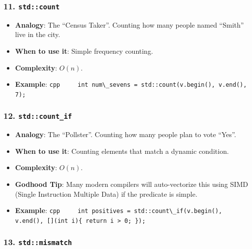 \hypertarget{stdcount}{%
\subsubsection{\texorpdfstring{11.
\texttt{std::count}}{11. std::count}}\label{stdcount}}

\begin{itemize}
\tightlist
\item
  \textbf{Analogy}: The ``Census Taker''. Counting how many people named
  ``Smith'' live in the city.
\item
  \textbf{When to use it}: Simple frequency counting.
\item
  \textbf{Complexity}: \(O(n)\).
\item
  \textbf{Example}:
  \passthrough{\lstinline!cpp     int num\_sevens = std::count(v.begin(), v.end(), 7);!}
\end{itemize}

\hypertarget{stdcount_if}{%
\subsubsection{\texorpdfstring{12.
\texttt{std::count\_if}}{12. std::count\_if}}\label{stdcount_if}}

\begin{itemize}
\tightlist
\item
  \textbf{Analogy}: The ``Pollster''. Counting how many people plan to
  vote ``Yes''.
\item
  \textbf{When to use it}: Counting elements that match a dynamic
  condition.
\item
  \textbf{Complexity}: \(O(n)\).
\item
  \textbf{Godhood Tip}: Many modern compilers will auto-vectorize this
  using SIMD (Single Instruction Multiple Data) if the predicate is
  simple.
\item
  \textbf{Example}:
  \passthrough{\lstinline!cpp     int positives = std::count\_if(v.begin(), v.end(), [](int i)\{ return i > 0; \});!}
\end{itemize}

\hypertarget{stdmismatch}{%
\subsubsection{\texorpdfstring{13.
\texttt{std::mismatch}}{13. std::mismatch}}\label{stdmismatch}}

